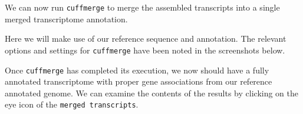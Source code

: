 \documentclass[a4paper,10pt]{article}
\begin{document}
We can now run \texttt{\footnotesize{cuffmerge}} to merge the assembled transcripts into a single merged transcriptome annotation.

Here we will make use of our reference sequence and annotation.  The relevant options and settings for \texttt{\footnotesize{cuffmerge}} have been noted in the screenshots below.\vspace{1em}\\
\setlength\fboxsep{0pt}\vspace{1em}
\setlength\fboxsep{0pt}\vspace{1em}

Once \texttt{\footnotesize{cuffmerge}} has completed its execution, we now should have a fully annotated transcriptome with proper gene associations from our reference annotated genome.  We can examine the contents of the results by clicking on the eye icon of the \texttt{\footnotesize{merged transcripts}}.\vspace{1em}\\
\setlength\fboxsep{0pt}\vspace{1em}
\end{document}
